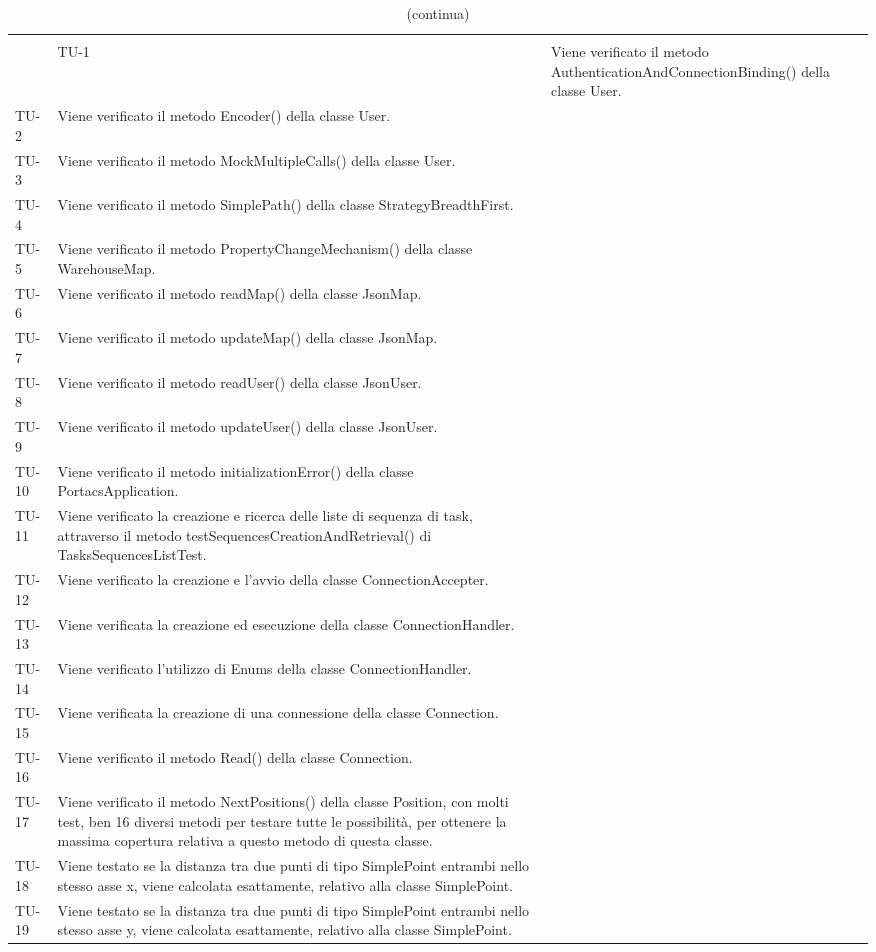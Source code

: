 \begin{longtable}{ >{\centering}p{} >{}p{}}


	\caption{Riepilogo Test di Unità}\\
	\hline
	\rowcolorhead
	 & \headertitle{Descrizione}
	\endfirsthead
	\caption[]{(continua)}\\
	\rowcolorhead
	 & \headertitle{Descrizione}
	\endhead

	TU-1 & Viene verificato il metodo AuthenticationAndConnectionBinding() della classe User.\tabularnewline
	TU-2 & Viene verificato il metodo Encoder() della classe User.\tabularnewline
	TU-3 & Viene verificato il metodo MockMultipleCalls() della classe User.\tabularnewline
	TU-4 & Viene verificato il metodo SimplePath() della classe StrategyBreadthFirst.\tabularnewline
	TU-5 & Viene verificato il metodo PropertyChangeMechanism() della classe WarehouseMap. \tabularnewline
	TU-6 & Viene verificato il metodo readMap() della classe JsonMap. \tabularnewline
	TU-7 & Viene verificato il metodo updateMap() della classe JsonMap. \tabularnewline
	TU-8 & Viene verificato il metodo readUser() della classe JsonUser. \tabularnewline
	TU-9 & Viene verificato il metodo updateUser() della classe JsonUser. \tabularnewline
	TU-10 & Viene verificato il metodo initializationError() della classe PortacsApplication. \tabularnewline
	TU-11 & Viene verificato la creazione e ricerca delle liste di sequenza di task, attraverso il metodo testSequencesCreationAndRetrieval() di TasksSequencesListTest. \tabularnewline
	TU-12 & Viene verificato la creazione e l'avvio della classe ConnectionAccepter. \tabularnewline
	TU-13 & Viene verificata la creazione ed esecuzione della classe ConnectionHandler. \tabularnewline
	TU-14 & Viene verificato l'utilizzo di Enums della classe ConnectionHandler. \tabularnewline
	TU-15 & Viene verificata la creazione di una connessione della classe Connection. \tabularnewline
	TU-16 & Viene verificato il metodo Read() della classe Connection. \tabularnewline
	TU-17 & Viene verificato il metodo NextPositions() della classe Position, con molti test, ben 16 diversi metodi per testare tutte le possibilità, per ottenere la massima copertura relativa a questo metodo di questa classe. \tabularnewline
	TU-18 & Viene testato se la distanza tra due punti di tipo SimplePoint entrambi nello stesso asse x, viene calcolata esattamente, relativo alla classe SimplePoint. \tabularnewline
	TU-19 & Viene testato se la distanza tra due punti di tipo SimplePoint entrambi nello stesso asse y, viene calcolata esattamente, relativo alla classe SimplePoint. \tabularnewline

\end{longtable}
